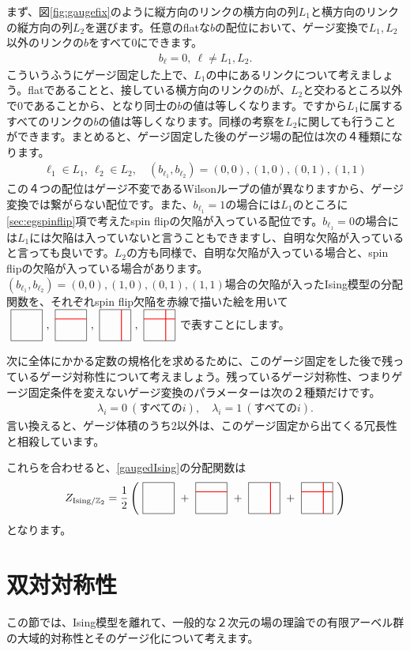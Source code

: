 \documentclass[report,paper=a4, fontsize=12pt, line_length=16cm, number_of_lines=33,dvipdfmx]{jlreq}
\numberwithin{equation}{chapter}
\newcommand{\Zb}{\mathbb{Z}}
\newcommand{\Zgauged}{Z_{\mathrm{Ising}/\Zb_2}}
\begin{document}
まず、図\ref{fig:gaugefix}のように縦方向のリンクの横方向の列$L_1$と横方向のリンクの縦方向の列$L_2$を選びます。任意のflatな$b$の配位において、ゲージ変換で$L_1,L_2$以外のリンクの$b$をすべて$0$にできます。
\begin{align}
  b_{\ell}=0,\ \ell \ne L_1, L_2.
\end{align}
こういうふうにゲージ固定した上で、$L_1$の中にあるリンクについて考えましょう。flatであることと、接している横方向のリンクの$b$が、$L_2$と交わるところ以外で$0$であることから、となり同士の$b$の値は等しくなります。ですから$L_1$に属するすべてのリンクの$b$の値は等しくなります。同様の考察を$L_2$に関しても行うことができます。まとめると、ゲージ固定した後のゲージ場の配位は次の４種類になります。
\begin{align}
  \ell_1\in L_1,\ \ell_2 \in L_2,\quad (b_{\ell_1},b_{\ell_2})=(0,0),(1,0),(0,1),(1,1)
\end{align}
この４つの配位はゲージ不変であるWilsonループの値が異なりますから、ゲージ変換では繋がらない配位です。また、$b_{\ell_1}=1$の場合には$L_1$のところに\ref{sec:egspinflip}項で考えたspin flipの欠陥が入っている配位です。$b_{\ell_1}=0$の場合には$L_1$には欠陥は入っていないと言うこともできますし、自明な欠陥が入っていると言っても良いです。$L_2$の方も同様で、自明な欠陥が入っている場合と、spin flipの欠陥が入っている場合があります。$(b_{\ell_1},b_{\ell_2})=(0,0),(1,0),(0,1),(1,1)$場合の欠陥が入ったIsing模型の分配関数を、それぞれspin flip欠陥を赤線で描いた絵を用いて$\torusoo,
\torusio,\torusoi,\torusii$で表すことにします。

次に全体にかかる定数の規格化を求めるために、このゲージ固定をした後で残っているゲージ対称性について考えましょう。残っているゲージ対称性、つまりゲージ固定条件を変えないゲージ変換のパラメーターは次の２種類だけです。
\begin{align}
  \lambda_i=0\ (\text{すべての}i),\quad \lambda_i=1\ (\text{すべての}i).
\end{align}
言い換えると、ゲージ体積のうち$2$以外は、このゲージ固定から出てくる冗長性と相殺しています。

これらを合わせると、\eqref{gaugedIsing}の分配関数は
\begin{align}
  \Zgauged=\frac{1}{2}\left(
    \torusoo + \torusio + \torusoi + \torusii
  \right)
\end{align}
となります。

\section{双対対称性}\label{sec:dualsymmetry}
この節では、Ising模型を離れて、一般的な２次元の場の理論での有限アーベル群の大域的対称性とそのゲージ化について考えます。
\end{document}
